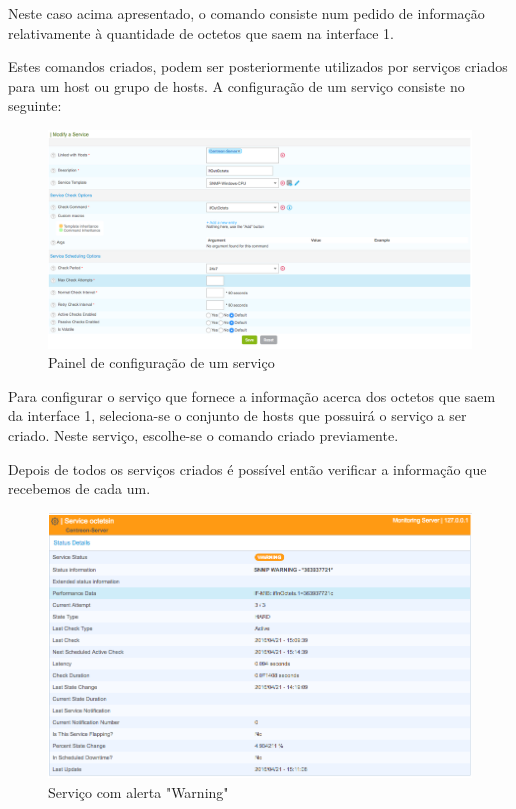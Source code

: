 \documentclass[pdftex,12pt,a4paper]{report}
\begin{document}
Neste caso acima apresentado, o comando consiste num pedido de informação relativamente à quantidade de octetos que saem na interface 1.

Estes comandos criados, podem ser posteriormente utilizados por serviços criados para um host ou grupo de hosts. A configuração de um serviço consiste no seguinte:

\begin{figure}[!htb]
\center
 \includegraphics[width=150mm,scale=1]{imagens/ConfiguracaoService.png}
 \caption{Painel de configuração de um serviço}
 \label{fig:service}
\end{figure}

Para configurar o serviço que fornece a informação acerca dos octetos que saem da interface 1, seleciona-se o conjunto de hosts que possuirá o serviço a ser criado. Neste serviço, escolhe-se o comando criado previamente.

Depois de todos os serviços criados é possível então verificar a informação que recebemos de cada um. 

\newpage

\begin{figure}[!htb]
\center
 \includegraphics[width=150mm,scale=1]{imagens/WarningService.png}
 \caption{Serviço com alerta "Warning"}
 \label{fig:warning}
\end{figure}
\end{document}
